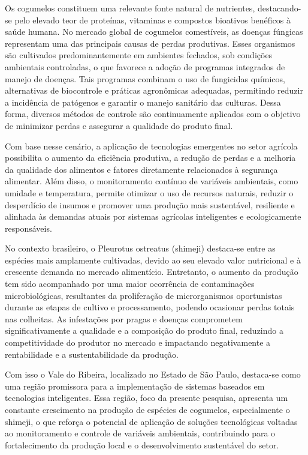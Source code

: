 Os cogumelos constituem uma relevante fonte natural de nutrientes, destacando-se pelo elevado teor de proteínas, vitaminas e compostos bioativos benéficos à saúde humana. No mercado global de cogumelos comestíveis, as doenças fúngicas representam uma das principais causas de perdas produtivas. Esses organismos são cultivados predominantemente em ambientes fechados, sob condições ambientais controladas, o que favorece a adoção de programas integrados de manejo de doenças. Tais programas combinam o uso de fungicidas químicos, alternativas de biocontrole e práticas agronômicas adequadas, permitindo reduzir a incidência de patógenos e garantir o manejo sanitário das culturas. Dessa forma, diversos métodos de controle são continuamente aplicados com o objetivo de minimizar perdas e assegurar a qualidade do produto final.\cite{MarceloBellettini2027}

Com base nesse cenário, a aplicação de tecnologias emergentes no setor agrícola possibilita o aumento da eficiência produtiva, a redução de perdas e a melhoria da qualidade dos alimentos e fatores diretamente relacionados à segurança alimentar. Além disso, o monitoramento contínuo de variáveis ambientais, como umidade e temperatura, permite otimizar o uso de recursos naturais, reduzir o desperdício de insumos e promover uma produção mais sustentável, resiliente e alinhada às demandas atuais por sistemas agrícolas inteligentes e ecologicamente responsáveis.

No contexto brasileiro, o Pleurotus ostreatus (shimeji) destaca-se entre as espécies mais amplamente cultivadas, devido ao seu elevado valor nutricional e à crescente demanda no mercado alimentício. Entretanto, o aumento da produção tem sido acompanhado por uma maior ocorrência de contaminações microbiológicas, resultantes da proliferação de microrganismos oportunistas durante as etapas de cultivo e processamento, podendo ocasionar perdas totais nas colheitas. As infestações por pragas e doenças comprometem significativamente a qualidade e a composição do produto final, reduzindo a competitividade do produtor no mercado e impactando negativamente a rentabilidade e a sustentabilidade da produção.\cite{RicardoScheffer2023}

Com isso o Vale do Ribeira, localizado no Estado de São Paulo, destaca-se como uma região promissora para a implementação de sistemas baseados em tecnologias inteligentes. Essa região, foco da presente pesquisa, apresenta um constante crescimento na produção de espécies de cogumelos, especialmente o shimeji, o que reforça o potencial de aplicação de soluções tecnológicas voltadas ao monitoramento e controle de variáveis ambientais, contribuindo para o fortalecimento da produção local e o desenvolvimento sustentável do setor.\cite{Urben2017,}

